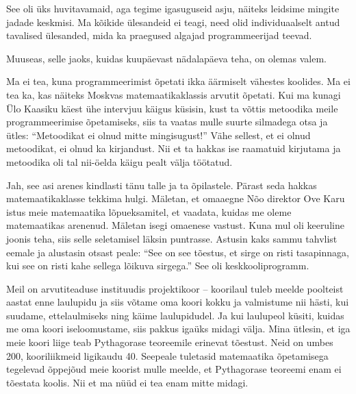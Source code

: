 See oli üks huvitavamaid, aga tegime igasuguseid asju, näiteks leidsime mingite jadade keskmisi. Ma kõikide ülesandeid ei teagi, need olid individuaalselt antud tavalised ülesanded, mida ka praegused algajad
programmeerijad teevad.

Muuseas, selle jaoks, kuidas kuupäevast nädalapäeva teha, on olemas valem.


Ma ei tea, kuna programmeerimist õpetati ikka äärmiselt vähestes koolides. Ma ei
tea ka, kas näiteks Moskvas matemaatikaklassis arvutit õpetati. Kui ma kunagi
Ülo Kaasiku käest ühe intervjuu käigus küsisin,
kust ta võttis metoodika meile programmeerimise õpetamiseks, siis ta vaatas
mulle suurte silmadega otsa ja ütles: \enquote{Metoodikat ei olnud mitte
mingisugust!} Vähe sellest, et ei olnud metoodikat, ei olnud ka kirjandust.
Nii et ta hakkas ise raamatuid kirjutama ja metoodika oli tal nii-öelda
käigu pealt välja töötatud.


Jah, see asi arenes kindlasti tänu talle ja ta õpilastele. Pärast
seda hakkas matemaatikaklasse tekkima hulgi. Mäletan, et omaaegne Nõo direktor Ove
Karu istus meie matemaatika lõpueksamitel, et vaadata, kuidas me
oleme matemaatikas arenenud. Mäletan isegi omaenese vastust. Kuna mul oli
keeruline joonis teha, siis selle seletamisel läksin puntrasse. Astusin kaks
sammu tahvlist eemale ja alustasin otsast peale: \enquote{See on see tõestus, et
sirge on risti tasapinnaga, kui see on risti kahe sellega lõikuva sirgega.} See
oli keskkooliprogramm.

Meil on arvutiteaduse instituudis
projektikoor -- koorilaul tuleb meelde poolteist aastat enne laulupidu ja siis
võtame oma koori kokku ja valmistume nii hästi, kui suudame, ettelaulmiseks ning
käime laulupidudel. Ja kui laulupeol küsiti, kuidas me oma koori
iseloomustame, siis pakkus igaüks midagi välja. Mina ütlesin, et iga meie koori
liige teab Pythagorase teoreemile erinevat tõestust. Neid on umbes 200,
kooriliikmeid ligikaudu 40. Seepeale tuletasid matemaatika
õpetamisega tegelevad õppejõud meie koorist mulle meelde, et
Pythagorase teoreemi enam ei tõestata koolis. Nii et ma nüüd ei tea enam mitte
midagi.



